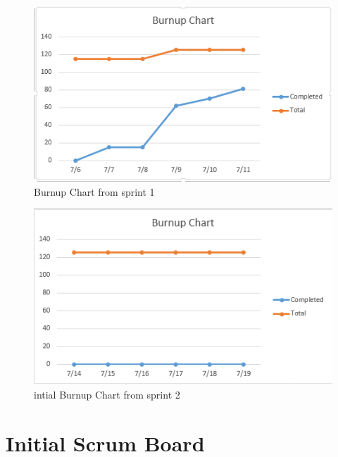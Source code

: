 \documentclass[10pt]{article}
\newcommand{\fancysecX}[2] {{\color{primary}\section*{#1} \label{sec:#2}}}
\begin{document}
    \begin{figure}[!ht]
  	\caption{Burnup Chart from sprint 1}
  	\centering
    		\includegraphics[width=1\textwidth]{../Sprint1/Burnupchart1}
    \end{figure}
        \begin{figure}[!ht]
        	\caption{intial Burnup Chart from sprint 2}
        	\centering
        	\includegraphics[width=1\textwidth]{../Sprint2/Burnupchart2Initial}
        \end{figure}

\vspace{5cm}
\fancysecX{Initial Scrum Board}{scrumboard}
\end{document}
